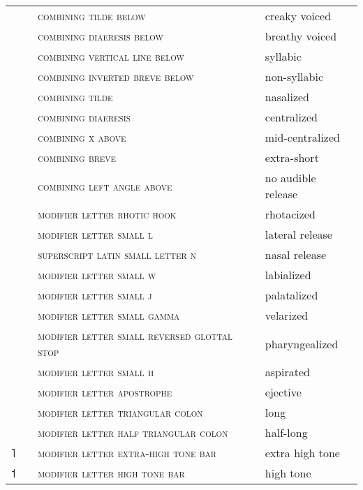 \begin{center}
\begin{xtabular}{ l L{1.1cm} L{6.2cm} L{3.6cm} }
 &  & \textsc{combining tilde below} & creaky voiced \\
 &  & \textsc{combining diaeresis below} & breathy voiced \\
 &  & \textsc{combining vertical line below} & syllabic \\
 &  & \textsc{combining inverted breve below} & non-syllabic \\
 &  & \textsc{combining tilde} & nasalized \\
 &  & \textsc{combining diaeresis} & centralized \\
 &  & \textsc{combining x above} & mid-centralized \\
 &  & \textsc{combining breve} & extra-short \\
 &  & \textsc{combining left angle above} & no audible release \\
 &  & \textsc{modifier letter rhotic hook} & rhotacized \\
 &  & \textsc{modifier letter small l} & lateral release \\
 &  & \textsc{superscript latin small letter n} & nasal release \\
 &  & \textsc{modifier letter small w} & labialized \\
 &  & \textsc{modifier letter small j} & palatalized \\
 &  & \textsc{modifier letter small gamma} & velarized \\
 &  & \textsc{modifier letter small reversed glottal stop} & pharyngealized \\
 &  & \textsc{modifier letter small h} & aspirated \\
 &  & \textsc{modifier letter apostrophe} & ejective \\
 &  & \textsc{modifier letter triangular colon} & long \\
 &  & \textsc{modifier letter half triangular colon} & half-long \\{˥} &  & \textsc{modifier letter extra-high tone bar} & extra high tone \\
{˦} &  & \textsc{modifier letter high tone bar} & high tone \\

\end{xtabular}
\end{center}
